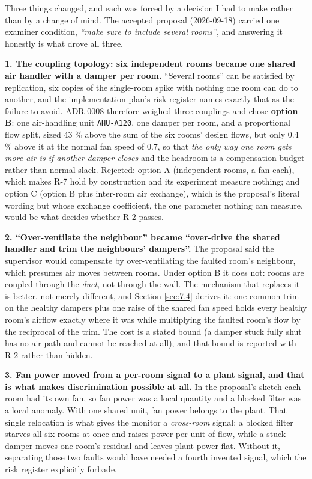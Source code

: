 Three things changed, and each was forced by a decision I had to make rather than by a change of
mind. The accepted proposal (2026-09-18) carried one examiner condition, \emph{``make sure to
include several rooms''}, and answering it honestly is what drove all three.

\textbf{1. The coupling topology: six independent rooms became one shared air handler with a
damper per room.} ``Several rooms'' can be satisfied by replication, six copies of the single-room
spike with nothing one room can do to another, and the implementation plan's risk register names
exactly that as the failure to avoid. ADR-0008 therefore weighed three couplings and chose
\textbf{option B}: one air-handling unit \texttt{AHU-A120}, one damper per room, and a
proportional flow split, sized 43 \% above the sum of the six rooms' design flows, but only
0.4 \% above it at the normal fan speed of 0.7, so that \emph{the only way one room gets more air
is if another damper closes} and the headroom is a compensation budget rather than normal slack. Rejected: option A
(independent rooms, a fan each), which makes R-7 hold by construction and its experiment measure
nothing; and option C (option B plus inter-room air exchange), which is the proposal's literal
wording but whose exchange coefficient, the one parameter nothing can measure, would be what
decides whether R-2 passes.

\textbf{2. ``Over-ventilate the neighbour'' became ``over-drive the shared handler and trim the
neighbours' dampers''.} The proposal said the supervisor would compensate by over-ventilating the
faulted room's neighbour, which presumes air moves between rooms. Under option B it does not:
rooms are coupled through the \emph{duct}, not through the wall. The mechanism that replaces it is
better, not merely different, and Section \ref{sec:7.4} derives it: one common trim on the healthy dampers
plus one raise of the shared fan speed holds every healthy room's airflow exactly where it was
while multiplying the faulted room's flow by the reciprocal of the trim. The cost is a stated
bound (a damper stuck fully shut has no air path and cannot be reached at all), and that bound is
reported with R-2 rather than hidden.

\textbf{3. Fan power moved from a per-room signal to a plant signal, and that is what makes
discrimination possible at all.} In the proposal's sketch each room had its own fan, so fan power
was a local quantity and a blocked filter was a local anomaly. With one shared unit, fan power
belongs to the plant. That single relocation is what gives the monitor a \emph{cross-room} signal:
a blocked filter starves all six rooms at once and raises power per unit of flow, while a stuck
damper moves one room's residual and leaves plant power flat. Without it, separating those two
faults would have needed a fourth invented signal, which the risk register explicitly forbade.

